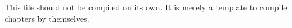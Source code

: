\documentclass{memoir}
\begin{document}
This file should not be compiled on its own. It is merely a template to
compile chapters by themselves.
\end{document}
